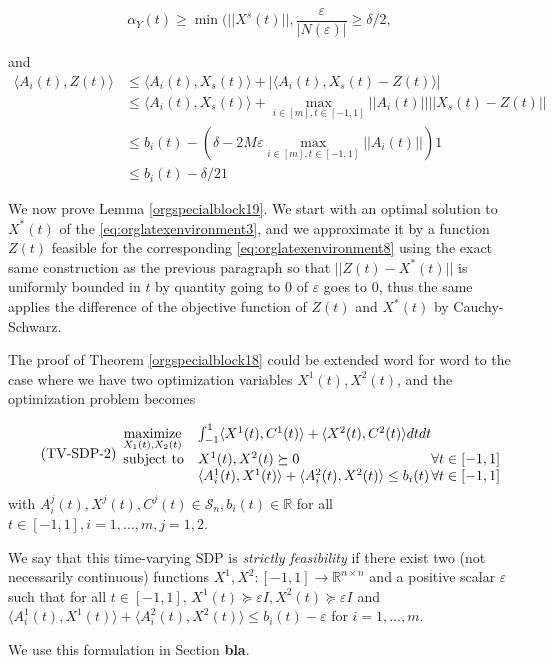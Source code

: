 \documentclass[moor]{informs1}
\begin{document}
$$\alpha_Y(t) \ge \min(||X^{s}(t)||, \frac{\varepsilon}{|N(\varepsilon)|} \ge \delta/2,$$

and
\begin{align*}
\langle A_i(t), Z(t) \rangle
&\le \langle A_i(t), X_s(t) \rangle + |\langle A_i(t), X_s(t)-Z(t) \rangle|
\\&\le \langle A_i(t), X_s(t) \rangle + \max_{i\in[m], t \in [-1, 1]}||A_i(t)|| ||X_s(t)-Z(t)||
\\&\le b_i(t) - (\delta - 2M \varepsilon \max_{i\in[m], t \in [-1, 1]}||A_i(t)||) 1
\\&\le b_i(t) - \delta/2 1
\end{align*}


We now prove Lemma \ref{orgspecialblock19}. We start with an optimal solution to  \(X^*(t)\) of the \ref{eq:orglatexenvironment3}, and we approximate it by a function \(Z(t)\) feasible for the corresponding \ref{eq:orglatexenvironment8} using the exact same construction as the previous paragraph so that \(||Z(t) - X^*(t)||\) is uniformly bounded in \(t\) by quantity going to 0 of \(\varepsilon\) goes to 0, thus the same applies the difference of the objective function of \(Z(t)\) and \(X^*(t)\) by Cauchy-Schwarz.




\begin{remark}
The proof of Theorem \ref{orgspecialblock18} could be extended word for word to the case where we have two optimization variables \(X^1(t), X^2(t)\), and the optimization problem becomes

\begin{equation*}
  \tag{TV-SDP-2}
  \begin{array}{ll@{}ll}
  \underset{X_1(t), X_2(t)}{\text{maximize}} & \int_{-1}^1 \langle X^1(t), C^1(t) \rangle + \langle X^2(t), C^2(t) \rangle dt dt   & \\
  \text{subject to}& X^1(t), X^2(t) \succeq 0 & \forall t \in [-1, 1]\\
  & \langle A^1_i(t), X^1(t) \rangle  + \langle A^2_i(t), X^2(t) \rangle\le b_i(t) & \forall t \in [-1, 1]
  \end{array}
  \end{equation*}
\noindent with \(A^j_i(t) , X^j(t), C^j(t) \in \mathcal S_n, b_i(t) \in \mathbb R\) for all \(t \in [-1, 1], i=1, \ldots, m, j=1,2\).


We say that this time-varying SDP is \emph{strictly feasibility} 
if there exist two (not necessarily continuous) functions \(X^1, X^2: [-1, 1] \rightarrow \mathbb R^{n \times n}\) and a positive scalar \(\varepsilon\) such that for all \(t \in [-1, 1]\), \(X^1(t) \succeq \varepsilon I, X^2(t) \succeq \varepsilon I\) and \(\langle A^1_i(t), X^1(t) \rangle  + \langle A^2_i(t), X^2(t) \rangle\le b_i(t) - \varepsilon\) for \(i = 1, \ldots, m\).

We use this formulation in Section \textbf{bla}.
\end{remark}
\newpage
\end{document}
